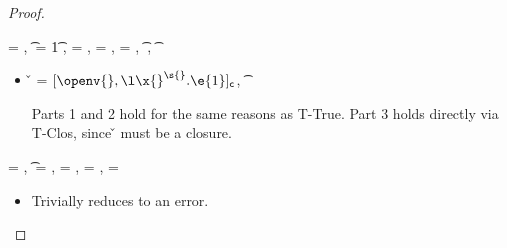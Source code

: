 \begin{lemma}
\begin{proof}
\begin{case}[T-Multi]
\end{case}

\begin{case}[T-Abs] \e{} = {\abs {\x{}} {\s{}} {}},
  \t{} = {\ArrowOne {\x{}} {\s{}}
                                                      {\t{1}}
                                                      {
                                                                  {}}
                                                      {}},
  {\thenprop{\prop{}}}= {\topprop{}},
  {\elseprop{\prop{}}}= {\botprop{}},
  {\object{}}= {\emptyobject{}},
{ \judgement {\propenv{}, {\isprop {\s{}} {\x{}}}}
            {} {\t{}}
             {
                         {}}
             {}},
\judgement {\propenv{}} {\abs {\x{}} {\s{}} {}} {\t{}}
                 {\filterset {\thenprop {\prop{}}}
                             {\elseprop {\prop{}}}}
                 {\object{}}

  \begin{itemize}
    \item[]
      \begin{subcase}[B-Abs]
        \v{} = ${\closure {\openv{}} {\abs {\x{}} {\s{}} {\e{1}}}}$,
          { \opsem {\openv{}}
                   {\abs {\x{}} {\t{}} {}}
                   {\closure {\openv{}} {\abs {\x{}} {\s{}} {}}}}

        Parts 1 and 2 hold for the same reasons as T-True.
        Part 3 holds directly via T-Clos, since \v{} must be a closure.
      \end{subcase}
  \end{itemize}
\end{case}

\begin{case}[T-Error]
  \e{} = ,
  \t{} = \Bot,
  \thenprop{\prop{}} = \botprop{}, \elseprop{\prop{}} = \botprop{}, \object{} = \emptyobject{}


  \begin{itemize}
    \item[]
      \begin{subcase}[BE-Error] 
        \opsem {\openv{}} {\e{}} {}

        Trivially reduces to an error.
      \end{subcase}
  \end{itemize}
\end{case}


\end{proof}
\end{lemma}
